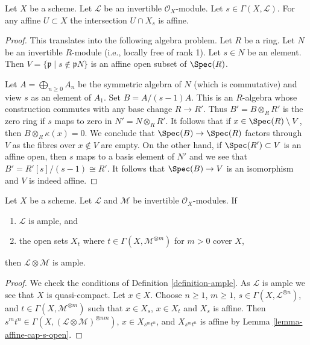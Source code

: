 \begin{lemma}
\label{lemma-affine-cap-s-open}
Let $X$ be a scheme. Let $\mathcal{L}$ be an invertible $\mathcal{O}_X$-module.
Let $s \in \Gamma(X, \mathcal{L})$. For any affine $U \subset X$
the intersection $U \cap X_s$ is affine.
\end{lemma}

\begin{proof}
This translates into the following algebra problem.
Let $R$ be a ring. Let $N$ be an invertible $R$-module
(i.e., locally free of rank 1). Let $s \in N$ be an element.
Then $V = \{\mathfrak p \mid s \not \in \mathfrak p N\}$ is
an affine open subset of $\Spec(R)$.

\medskip\noindent
Let $A = \bigoplus_{n \geq 0} A_n$ be the symmetric algebra of $N$
(which is commutative) and view $s$ as an element of $A_1$.
Set $B = A/(s - 1)A$. This is an $R$-algebra whose construction
commutes with any base change $R \to R'$. Thus $B' = B \otimes_R R'$
is the zero ring if $s$ maps to zero in $N' = N \otimes_R R'$. It
follows that if $x \in \Spec(R) \setminus V$, then $B \otimes_R \kappa(x) = 0$.
We conclude that $\Spec(B) \to \Spec(R)$ factors through $V$ as the
fibres over $x \not \in V$ are empty. On the other hand, if
$\Spec(R') \subset V$ is an affine open, then $s$ maps to a basis
element of $N'$ and we see that $B' = R'[s]/(s - 1) \cong R'$.
It follows that $\Spec(B) \to V$ is an isomorphism and $V$ is
indeed affine.
\end{proof}

\begin{lemma}
\label{lemma-ample-tensor-globally-generated}
\begin{reference}
\cite[II Proposition 4.5.6(ii)]{EGA}
\end{reference}
Let $X$ be a scheme. Let $\mathcal{L}$ and $\mathcal{M}$
be invertible $\mathcal{O}_X$-modules. If
\begin{enumerate}
\item $\mathcal{L}$ is ample, and
\item the open sets $X_t$ where $t \in \Gamma(X, \mathcal{M}^{\otimes m})$
for $m > 0$ cover $X$,
\end{enumerate}
then $\mathcal{L} \otimes \mathcal{M}$ is ample.
\end{lemma}

\begin{proof}
We check the conditions of Definition \ref{definition-ample}.
As $\mathcal{L}$ is ample we see that $X$ is quasi-compact.
Let $x \in X$. Choose $n \geq 1$, $m \geq 1$,
$s \in \Gamma(X, \mathcal{L}^{\otimes n})$, and
$t \in \Gamma(X, \mathcal{M}^{\otimes m})$
such that $x \in X_s$, $x \in X_t$ and $X_s$ is affine.
Then $s^mt^n \in \Gamma(X, (\mathcal{L} \otimes \mathcal{M})^{\otimes nm})$,
$x \in X_{s^mt^n}$, and $X_{s^mt^n}$ is affine by
Lemma \ref{lemma-affine-cap-s-open}.
\end{proof}

